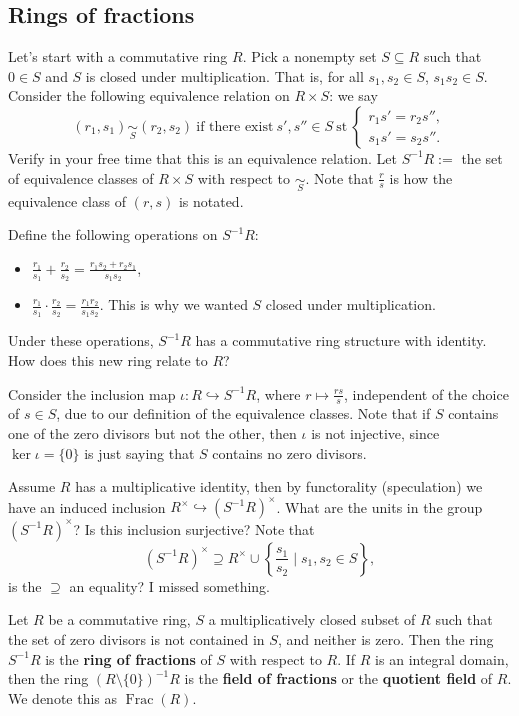 \subsection{Rings of fractions}
Let's start with a commutative ring $R$. Pick a nonempty set $S\subseteq R$ such that $0\in S$ and $S$ is closed under multiplication. That is, for all $s_1,s_2\in S$, $s_1s_2\in S$. Consider the following equivalence relation on $R\times S$: we say \[
    (r_1,s_1)\underset{S}{\sim}(r_2,s_2) \ \text{if there exist} \ s',s''\in S \ \text{st} \
    \begin{cases}
        r_1s'=r_2s'',\\
        s_1s'=s_2s''.
    \end{cases}
\] Verify in your free time that this is an equivalence relation. Let $S^{-1}R:=$ the set of equivalence classes of $R\times S$ with respect to $\underset{S}{\sim}$. Note that $\frac{r}{s}$ is how the equivalence class of $(r,s)$ is notated.

Define the following operations on $S^{-1}R$:
\begin{itemize}
    \item $\frac{r_1}{s_1}+\frac{r_2}{s_2}=\frac{r_1s_2+r_2s_1}{s_1s_2}$,
    \item $\frac{r_1}{s_1}\cdot \frac{r_2}{s_2}=\frac{r_1r_2}{s_1s_2}$. This is why we wanted $S$ closed under multiplication.
\end{itemize}
Under these operations, $S^{-1}R$ has a commutative ring structure with identity. How does this new ring relate to $R$? 
\begin{remark}
    Consider the inclusion map $\iota \colon R\hookrightarrow S^{-1}R$, where $r\mapsto \frac{rs}{s}$, independent of the choice of $s\in S$, due to our definition of the equivalence classes. Note that if $S$ contains one of the zero divisors but not the other, then $\iota$ is not injective, since $\ker \iota=\{0\} $ is just saying that $S$ contains no zero divisors.
\end{remark}
Assume $R$ has a multiplicative identity, then by functorality (speculation) we have an induced inclusion $R^{\times }\hookrightarrow (S^{-1}R)^{\times }$. What are the units in the group $(S^{-1}R)^{\times }$? Is this inclusion surjective? Note that
\[
    (S^{-1}R)^{\times }\supseteq R^{\times }\cup \left\{\frac{s_1}{s_2} \mid s_1,s_2\in S\right\} ,
\] is the $\supseteq$ an equality?  I missed something.
\begin{definition}
    Let $R$ be a commutative ring, $S$ a multiplicatively closed subset of $R$ such that the set of zero divisors is not contained in $S$, and neither is zero. Then the ring $S^{-1}R$ is the \textbf{ring of fractions} of $S$ with respect to $R$. If $R$ is an integral domain, then the ring $(R\setminus \{0\} )^{-1}R$ is the \textbf{field of fractions} or the \textbf{quotient field} of $R$. We denote this as $\operatorname{Frac}(R)$.
\end{definition}
